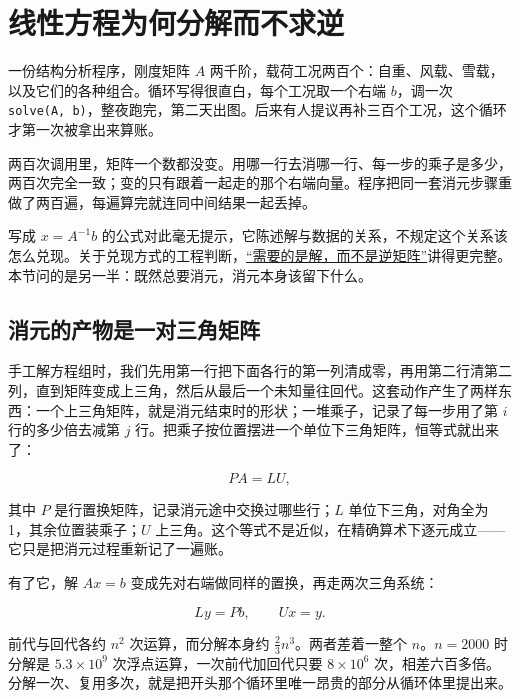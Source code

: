 \section{线性方程为何分解而不求逆}
\label{sec:08-Numerical-Analysis/05-Numerical-Linear-Algebra/01}

一份结构分析程序，刚度矩阵 \(A\) 两千阶，载荷工况两百个：自重、风载、雪载，以及它们的各种组合。循环写得很直白，每个工况取一个右端 \(b\)，调一次 \texttt{solve(A, b)}，整夜跑完，第二天出图。后来有人提议再补三百个工况，这个循环才第一次被拿出来算账。

两百次调用里，矩阵一个数都没变。用哪一行去消哪一行、每一步的乘子是多少，两百次完全一致；变的只有跟着一起走的那个右端向量。程序把同一套消元步骤重做了两百遍，每遍算完就连同中间结果一起丢掉。

写成 \(x=A^{-1}b\) 的公式对此毫无提示，它陈述解与数据的关系，不规定这个关系该怎么兑现。关于兑现方式的工程判断，\hyperref[sec:08-Numerical-Analysis/07-Numerical-Methods-for-ML/03]{``需要的是解，而不是逆矩阵''}讲得更完整。本节问的是另一半：既然总要消元，消元本身该留下什么。

\subsection{消元的产物是一对三角矩阵}

手工解方程组时，我们先用第一行把下面各行的第一列清成零，再用第二行清第二列，直到矩阵变成上三角，然后从最后一个未知量往回代。这套动作产生了两样东西：一个上三角矩阵，就是消元结束时的形状；一堆乘子，记录了每一步用了第 \(i\) 行的多少倍去减第 \(j\) 行。把乘子按位置摆进一个单位下三角矩阵，恒等式就出来了：

\[
PA=LU,
\]

其中 \(P\) 是行置换矩阵，记录消元途中交换过哪些行；\(L\) 单位下三角，对角全为 1，其余位置装乘子；\(U\) 上三角。这个等式不是近似，在精确算术下逐元成立——它只是把消元过程重新记了一遍账。

有了它，解 \(Ax=b\) 变成先对右端做同样的置换，再走两次三角系统：

\[
Ly=Pb,\qquad Ux=y.
\]

前代与回代各约 \(n^2\) 次运算，而分解本身约 \(\tfrac23n^3\)。两者差着一整个 \(n\)。\(n=2000\) 时分解是 \(5.3\times10^9\) 次浮点运算，一次前代加回代只要 \(8\times10^6\) 次，相差六百多倍。分解一次、复用多次，就是把开头那个循环里唯一昂贵的部分从循环体里提出来。


